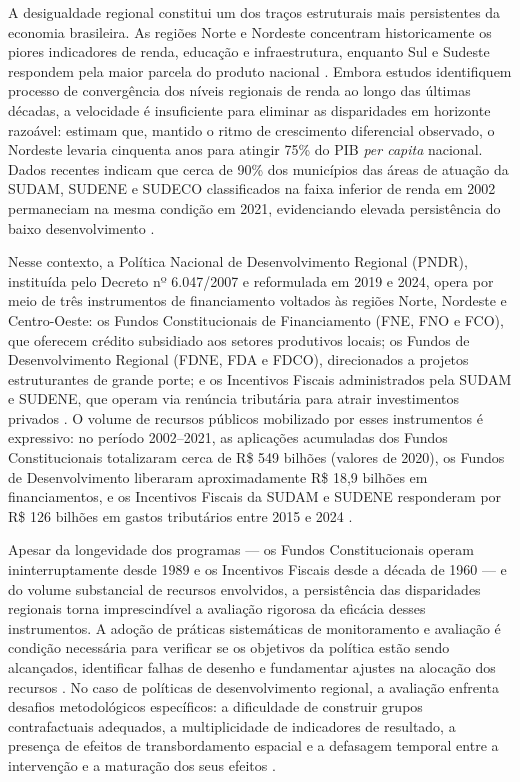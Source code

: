 
A desigualdade regional constitui um dos traços estruturais mais persistentes da economia brasileira. As regiões Norte e Nordeste concentram historicamente os piores indicadores de renda, educação e infraestrutura, enquanto Sul e Sudeste respondem pela maior parcela do produto nacional \cite{Ferreira1995,Silveira2011}. Embora estudos identifiquem processo de convergência dos níveis regionais de renda ao longo das últimas décadas, a velocidade é insuficiente para eliminar as disparidades em horizonte razoável:  estimam que, mantido o ritmo de crescimento diferencial observado, o Nordeste levaria cinquenta anos para atingir 75\% do PIB \textit{per capita} nacional. Dados recentes indicam que cerca de 90\% dos municípios das áreas de atuação da SUDAM, SUDENE e SUDECO classificados na faixa inferior de renda em 2002 permaneciam na mesma condição em 2021, evidenciando elevada persistência do baixo desenvolvimento \cite{Portugal2024}.

Nesse contexto, a Política Nacional de Desenvolvimento Regional (PNDR), instituída pelo Decreto nº 6.047/2007 e reformulada em 2019 e 2024, opera por meio de três instrumentos de financiamento voltados às regiões Norte, Nordeste e Centro-Oeste: os Fundos Constitucionais de Financiamento (FNE, FNO e FCO), que oferecem crédito subsidiado aos setores produtivos locais; os Fundos de Desenvolvimento Regional (FDNE, FDA e FDCO), direcionados a projetos estruturantes de grande porte; e os Incentivos Fiscais administrados pela SUDAM e SUDENE, que operam via renúncia tributária para atrair investimentos privados \cite{Portugal2020}. O volume de recursos públicos mobilizado por esses instrumentos é expressivo: no período 2002--2021, as aplicações acumuladas dos Fundos Constitucionais totalizaram cerca de R\$ 549 bilhões (valores de 2020), os Fundos de Desenvolvimento liberaram aproximadamente R\$ 18,9 bilhões em financiamentos, e os Incentivos Fiscais da SUDAM e SUDENE responderam por R\$ 126 bilhões em gastos tributários entre 2015 e 2024 \cite{Portugal2024}.

Apesar da longevidade dos programas --- os Fundos Constitucionais operam ininterruptamente desde 1989 e os Incentivos Fiscais desde a década de 1960 --- e do volume substancial de recursos envolvidos, a persistência das disparidades regionais torna imprescindível a avaliação rigorosa da eficácia desses instrumentos. A adoção de práticas sistemáticas de monitoramento e avaliação é condição necessária para verificar se os objetivos da política estão sendo alcançados, identificar falhas de desenho e fundamentar ajustes na alocação dos recursos \cite{Lima2025}. No caso de políticas de desenvolvimento regional, a avaliação enfrenta desafios metodológicos específicos: a dificuldade de construir grupos contrafactuais adequados, a multiplicidade de indicadores de resultado, a presença de efeitos de transbordamento espacial e a defasagem temporal entre a intervenção e a maturação dos seus efeitos \cite{Oecd2025}.

